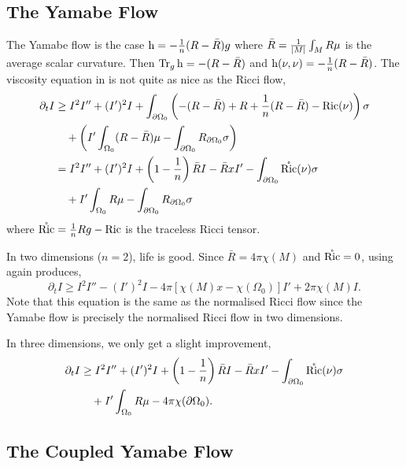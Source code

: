 \documentclass{amsart}
\begin{document}
\subsection{The Yamabe Flow}
\label{subsec:flows_yamabe}

The Yamabe flow is the case \(\operatorname{h} = -\tfrac{1}{n}(R - \bar{R})g\) where \(\bar{R} = \tfrac{1}{\left|{M}\right|} \int_M R \mu\) is the average scalar curvature. Then \(\operatorname{Tr}_g \operatorname{h} = -(R - \bar{R})\) and \(\operatorname{h}(\nu, \nu) = -\tfrac{1}{n}(R - \bar{R})\). The viscosity equation in  is not quite as nice as the Ricci flow,
\[
\begin{split}
\partial_t I &\geq I^2 I'' +  (I')^2 I + \int_{\partial {\Omega_0}} \left(-(R - \bar{R}) + R + \frac{1}{n}(R - \bar{R}) - \operatorname{Ric}(\nu)\right) \sigma \\
&\quad + \left(I'\int_{\Omega_0} (R - \bar{R}) \mu - \int_{\partial {\Omega_0}} R_{\partial {\Omega_0}}\sigma \right) \\
&= I^2 I'' +  (I')^2 I + \left(1 - \frac{1}{n}\right) \bar{R} I - \bar{R}xI' - \int_{\partial {\Omega_0}} \mathring{\operatorname{Ric}} (\nu) \sigma \\
&\quad + I' \int_{\Omega_0} R \mu - \int_{\partial {\Omega_0}} R_{\partial {\Omega_0}}\sigma
\end{split}
\]
where \(\mathring{\operatorname{Ric}} = \tfrac{1}{n}Rg - \operatorname{Ric}\) is the traceless Ricci tensor.

In two dimensions (\(n=2\)), life is good. Since \(\bar{R} = 4\pi \chi(M)\) and \(\mathring{\operatorname{Ric}} = 0\), using  again produces,
\[
\partial_t I \geq I^2 I'' -  (I')^2 I - 4\pi\left[\chi(M)x - \chi(\Omega_0)\right]I' + 2\pi\chi(M) I.
\]
Note that this equation is the same as the normalised Ricci flow since the Yamabe flow is precisely the normalised Ricci flow in two dimensions.

In three dimensions, we only get a slight improvement,
\[
\begin{split}
\partial_t I &\geq I^2 I'' +  (I')^2 I + \left(1 - \frac{1}{n}\right) \bar{R} I - \bar{R}xI' - \int_{\partial {\Omega_0}} \mathring{\operatorname{Ric}} (\nu) \sigma \\
&\quad + I' \int_{\Omega_0} R \mu - 4\pi\chi(\partial {\Omega_0}).
\end{split}
\]


\subsection{The Coupled Yamabe Flow }
\label{subsec:flows_yamabe_coupled}
\end{document}
